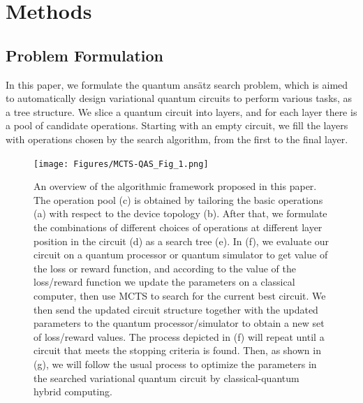 \documentclass[a4paper,onecolumn,11pt]{quantumarticle}
\begin{document}








\section{Methods}\label{methods}
\subsection{Problem Formulation}
In this paper, we formulate the quantum ans\"atz search problem, which is aimed to automatically design variational quantum circuits to perform various tasks, as a tree structure. We slice a quantum circuit into layers, and for each layer there is a pool of candidate operations. Starting with an empty circuit, we fill the layers with operations chosen by the search algorithm, from the first to the final layer. 
\begin{figure}[H]
  \centering
  \texttt{[image: Figures/MCTS-QAS\_Fig\_1.png]}
  \caption{An overview of the algorithmic framework proposed in this paper. The operation pool (c) is obtained by tailoring the basic operations (a) with respect to the device topology (b). After that, we formulate the combinations of different choices of operations at different layer position in the circuit (d) as a search tree (e). In (f), we evaluate our circuit on a quantum processor or quantum simulator to get value of the loss or reward function, and according to the value of the loss/reward function we update the parameters on a classical computer, then use MCTS to search for the current best circuit. We then send the updated circuit structure together with the updated parameters to the quantum processor/simulator to obtain a new set of loss/reward values. The process depicted in (f) will repeat until a circuit that meets the stopping criteria is found. Then, as shown in (g), we will follow the usual process to optimize the parameters in the searched variational quantum circuit by classical-quantum hybrid computing.}
  \label{fig:overview}
\end{figure}
\end{document}
